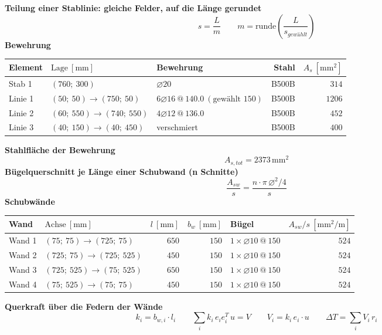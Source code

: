\documentclass[11pt,a4paper]{article}
\begin{document}
\noindent\textbf{Teilung einer Stablinie: gleiche Felder, auf die Länge gerundet}
\begin{equation*}
s = \frac{L}{m} \qquad m = \mathrm{runde}\left(\frac{L}{s_{gewählt}}\right)
\end{equation*}
\noindent\textbf{Bewehrung}
\begin{longtable}{lllrr}
\hline
Element & $\text{Lage}\ [\mathrm{mm}]$ & Bewehrung & Stahl & $A_s\ [\mathrm{mm}^2]$ \\
\hline
\endhead
Stab 1 & $(760;\ 300)$ & $\varnothing 20$ & B500B & $314$ \\
Linie 1 & $(50;\ 50) \rightarrow (750;\ 50)$ & $6 \varnothing 16\ @\ 140.0\ (\text{gewählt } 150)$ & B500B & $1206$ \\
Linie 2 & $(60;\ 550) \rightarrow (740;\ 550)$ & $4 \varnothing 12\ @\ 136.0$ & B500B & $452$ \\
Linie 3 & $(40;\ 150) \rightarrow (40;\ 450)$ & verschmiert & B500B & $400$ \\
\hline
\end{longtable}
\noindent\textbf{Stahlfläche der Bewehrung}
\begin{equation*}
A_{s,tot} = 2373\,\mathrm{mm}^{2}
\end{equation*}
\noindent\textbf{Bügelquerschnitt je Länge einer Schubwand (n Schnitte)}
\begin{equation*}
\frac{A_{sw}}{s} = \frac{n \cdot \pi\, \varnothing^2 / 4}{s}
\end{equation*}
\noindent\textbf{Schubwände}
\begin{longtable}{llrrlr}
\hline
Wand & $\text{Achse}\ [\mathrm{mm}]$ & $l\ [\mathrm{mm}]$ & $b_w\ [\mathrm{mm}]$ & Bügel & $A_{sw}/s\ [\mathrm{mm}^2/\mathrm{m}]$ \\
\hline
\endhead
Wand 1 & $(75;\ 75) \rightarrow (725;\ 75)$ & $650$ & $150$ & $1 \times \varnothing 10\ @\ 150$ & $524$ \\
Wand 2 & $(725;\ 75) \rightarrow (725;\ 525)$ & $450$ & $150$ & $1 \times \varnothing 10\ @\ 150$ & $524$ \\
Wand 3 & $(725;\ 525) \rightarrow (75;\ 525)$ & $650$ & $150$ & $1 \times \varnothing 10\ @\ 150$ & $524$ \\
Wand 4 & $(75;\ 525) \rightarrow (75;\ 75)$ & $450$ & $150$ & $1 \times \varnothing 10\ @\ 150$ & $524$ \\
\hline
\end{longtable}
\noindent\textbf{Querkraft über die Federn der Wände}
\begin{equation*}
k_i = b_{w,i} \cdot l_i \qquad \sum_i k_i\, e_i e_i^T\, u = V \qquad V_i = k_i\, e_i \cdot u \qquad \Delta T = \sum_i V_i\, r_i
\end{equation*}
\end{document}
